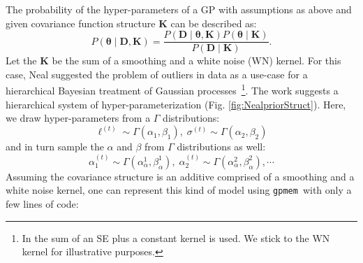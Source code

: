 \documentclass{article} %
\newcommand{\gpmem}{\texttt{gpmem}}
\begin{document}
The probability of the hyper-parameters of a GP with assumptions as above and given covariance function structure $\mathbf{K}$ can be described as:
\begin{equation}
\label{eq:hyperProbability}
P(\bm{\theta} \mid \mathbf{D,K}) = \frac{P(\mathbf{D} \mid \bm{\theta}, \mathbf{K})P(\bm{\theta} \mid  \mathbf{K})}{P(\mathbf{D} \mid \mathbf{K})}.
\end{equation}
Let the $\mathbf{K}$ be the sum of a smoothing and a white noise (WN) kernel. For this case, Neal suggested the problem of outliers in data as a use-case for a hierarchical Bayesian treatment of Gaussian processes~\citeyearpar{neal1997monte}\footnote{In \citep{neal1997monte} the sum of an SE plus a constant kernel is used. We stick to the WN kernel for illustrative purposes.}. The work suggests a hierarchical system of hyper-parameterization (Fig. \ref{fig:NealpriorStruct}). Here, we draw hyper-parameters from a $\Gamma$ distributions:
\begin{equation}
\ell^{(t)} \sim \Gamma(\alpha_1,\beta_1),\;\sigma^{(t)} \sim \Gamma(\alpha_2,\beta_2)
\end{equation} 
and in turn sample the $\alpha$ and $\beta$ from $\Gamma$ distributions as well:
\begin{equation}
\alpha_1^{(t)} \sim \Gamma(\alpha^1_{\alpha},\beta^1_{ \alpha } ),\; \alpha_2^{(t)} \sim \Gamma(\alpha^2_{\alpha},\beta^2_{\alpha}),\cdots
\end{equation}
Assuming the covariance structure is an additive comprised of a smoothing and a white noise kernel, one can represent this kind of model using \gpmem\ with only a few lines of code:
\end{document}
